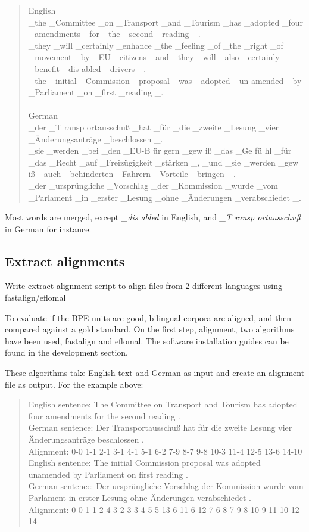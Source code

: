 \begin{quote}
	English\\
	\_the \_Committee \_on \_Transport \_and \_Tourism \_has \_adopted \_four \_amendments \_for \_the \_second \_reading \_.\\
	\_they \_will \_certainly \_enhance \_the \_feeling \_of \_the \_right \_of \_movement \_by \_EU \_citizens \_and \_they \_will \_also \_certainly \_benefit \_dis abled \_drivers \_.\\
	\_the \_initial \_Commission \_proposal \_was \_adopted \_un amended \_by \_Parliament \_on \_first \_reading \_.\\\\
	German\\
	\_der \_T ransp ortausschuß \_hat \_für \_die \_zweite \_Lesung \_vier \_Änderungsanträge \_beschlossen \_.\\
	\_sie \_werden \_bei \_den \_EU-B ür gern \_gew iß \_das \_Ge fü hl \_für \_das \_Recht \_auf \_Freizügigkeit \_stärken \_, \_und \_sie \_werden \_gew iß \_auch \_behinderten \_Fahrern \_Vorteile \_bringen \_.\\
	\_der \_ursprüngliche \_Vorschlag \_der \_Kommission \_wurde \_vom \_Parlament \_in \_erster \_Lesung \_ohne \_Änderungen \_verabschiedet \_.
\end{quote}

Most words are merged, except \emph{\_dis abled} in English, and \emph{\_T ransp ortausschuß} in German for instance.

\subsection{Extract alignments}

Write extract alignment script to align files from 2 different languages using fastalign/eflomal

To evaluate if the BPE units are good, bilingual corpora are aligned, and then compared against a gold standard. On the first step, alignment, two algorithms have been used, fastalign and eflomal. The software installation guides can be found in the development section.

These algorithms take English text and German as input and create an alignment file as output. For the example above:

\begin{quote}
	English sentence: The Committee on Transport and Tourism has adopted four amendments for the second reading .\\
	German sentence: Der Transportausschuß hat für die zweite Lesung vier Änderungsanträge beschlossen .\\
	Alignment: 0-0 1-1 2-1 3-1 4-1 5-1 6-2 7-9 8-7 9-8 10-3 11-4 12-5 13-6 14-10\\

	English sentence: The initial Commission proposal was adopted unamended by Parliament on first reading .\\
	German sentence: Der ursprüngliche Vorschlag der Kommission wurde vom Parlament in erster Lesung ohne Änderungen verabschiedet .\\
	Alignment: 0-0 1-1 2-4 3-2 3-3 4-5 5-13 6-11 6-12 7-6 8-7 9-8 10-9 11-10 12-14
\end{quote}

